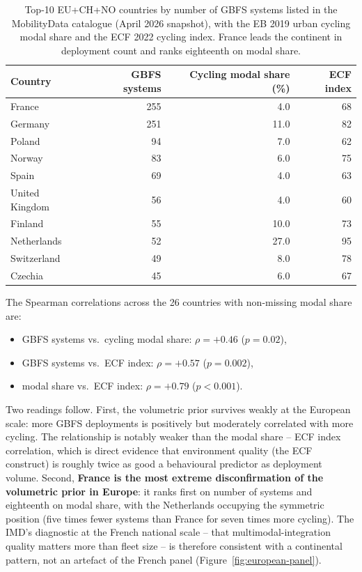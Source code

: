\documentclass[11pt,a4paper]{article}
\begin{document}
\begin{table}[H]
\centering
\caption{Top-10 EU+CH+NO countries by number of GBFS systems
listed in the MobilityData catalogue (April 2026 snapshot), with
the EB 2019 urban cycling modal share and the ECF 2022 cycling
index. France leads the continent in deployment count and ranks
eighteenth on modal share.}
\label{tab:european-panel}
\small
\begin{tabular}{@{}lrrr@{}}
\toprule
Country & GBFS systems & Cycling modal share (\%) & ECF index \\
\midrule
France             & 255 &  4.0 & 68 \\
Germany            & 251 & 11.0 & 82 \\
Poland             &  94 &  7.0 & 62 \\
Norway             &  83 &  6.0 & 75 \\
Spain              &  69 &  4.0 & 63 \\
United Kingdom     &  56 &  4.0 & 60 \\
Finland            &  55 & 10.0 & 73 \\
Netherlands        &  52 & 27.0 & 95 \\
Switzerland        &  49 &  8.0 & 78 \\
Czechia            &  45 &  6.0 & 67 \\
\bottomrule
\end{tabular}
\end{table}

The Spearman correlations across the 26 countries with non-missing
modal share are:
\begin{itemize}
\item GBFS systems vs.\ cycling modal share: $\rho = +0.46$
($p = 0.02$),
\item GBFS systems vs.\ ECF index: $\rho = +0.57$ ($p = 0.002$),
\item modal share vs.\ ECF index: $\rho = +0.79$ ($p < 0.001$).
\end{itemize}

Two readings follow. First, the volumetric prior survives weakly
at the European scale: more GBFS deployments is positively but
moderately correlated with more cycling. The relationship is
notably weaker than the modal share -- ECF index correlation,
which is direct evidence that environment quality (the ECF
construct) is roughly twice as good a behavioural predictor as
deployment volume. Second, \textbf{France is the most extreme
disconfirmation of the volumetric prior in Europe}: it ranks
first on number of systems and eighteenth on modal share, with
the Netherlands occupying the symmetric position (five times
fewer systems than France for seven times more cycling). The
IMD's diagnostic at the French national scale -- that
multimodal-integration quality matters more than fleet size --
is therefore consistent with a continental pattern, not an
artefact of the French panel
(Figure~\ref{fig:european-panel}).
\end{document}
